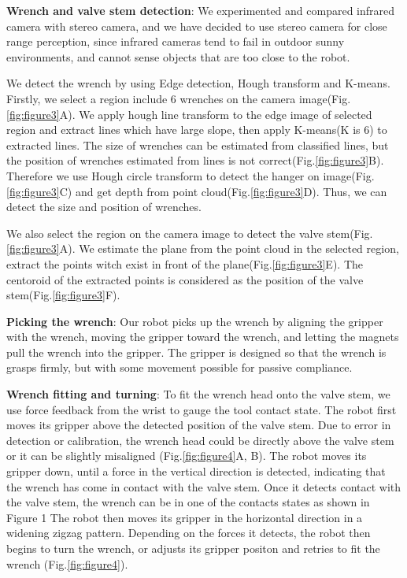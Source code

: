 \documentclass{standalone}
\begin{document}
\textbf{Wrench and valve stem detection}: We experimented and compared infrared camera with stereo camera, and we have decided to use stereo camera for close range perception, since infrared cameras tend to fail in outdoor sunny environments, and cannot sense objects that are too close to the robot. 

We detect the wrench by using Edge detection, Hough transform and K-means. Firstly, we select a region include 6 wrenches on the camera image(Fig.\ref{fig:figure3}A). We apply hough line transform to the edge image of selected region and extract lines which have large slope, then apply K-means(K is 6) to extracted lines. The size of wrenches can be estimated from classified lines, but the position of wrenches estimated from lines is not correct(Fig.\ref{fig:figure3}B). Therefore we use Hough circle transform to detect the hanger on image(Fig.\ref{fig:figure3}C) and get depth from point cloud(Fig.\ref{fig:figure3}D). Thus, we can detect the size and position of wrenches.  

We also select the region on the camera image to detect the valve stem(Fig.\ref{fig:figure3}A). We estimate the plane from the point cloud in the selected region, extract the points witch exist in front of the plane(Fig.\ref{fig:figure3}E). The centoroid of the extracted points is considered as the position of the valve stem(Fig.\ref{fig:figure3}F).

\textbf{Picking the wrench}: Our robot picks up the wrench by aligning the gripper with the wrench, moving the gripper toward the wrench, and letting the magnets pull the wrench into the gripper. The gripper is designed so that the wrench is grasps firmly, but with some movement possible for passive compliance.

\textbf{Wrench fitting and turning}: To fit the wrench head onto the valve stem, we use force feedback from the wrist to gauge the tool contact state. The robot first moves its gripper above the detected position of the valve stem. Due to error in detection or calibration, the wrench head could be directly above the valve stem or it can be slightly misaligned (Fig.\ref{fig:figure4}A, B). The robot moves its gripper down, until a force in the vertical direction is detected, indicating that the wrench has come in contact with the valve stem. Once it detects contact with the valve stem, the wrench can be in one of the contacts states as shown in Figure 1 The robot then moves its gripper in the horizontal direction in a widening zigzag pattern. Depending on the forces it detects, the robot then begins to turn the wrench, or adjusts its gripper positon and retries to fit the wrench (Fig.\ref{fig:figure4}).
\end{document}
